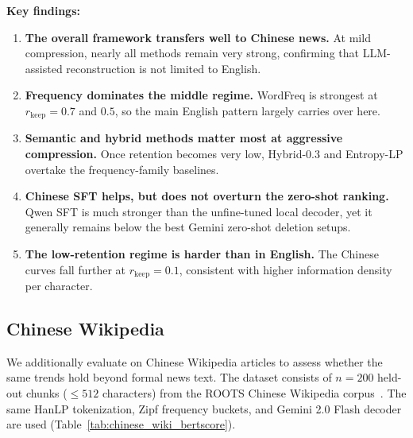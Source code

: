\documentclass[11pt]{article}
\newcommand{\rkeep}{r_{\mathrm{keep}}}
\begin{document}
\textbf{Key findings:}
\begin{enumerate}
    \item \textbf{The overall framework transfers well to Chinese news.} At mild compression, nearly all methods remain very strong, confirming that LLM-assisted reconstruction is not limited to English.
    \item \textbf{Frequency dominates the middle regime.} WordFreq is strongest at $\rkeep=0.7$ and $0.5$, so the main English pattern largely carries over here.
    \item \textbf{Semantic and hybrid methods matter most at aggressive compression.} Once retention becomes very low, Hybrid-$0.3$ and Entropy-LP overtake the frequency-family baselines.
    \item \textbf{Chinese SFT helps, but does not overturn the zero-shot ranking.} Qwen SFT is much stronger than the unfine-tuned local decoder, yet it generally remains below the best Gemini zero-shot deletion setups.
    \item \textbf{The low-retention regime is harder than in English.} The Chinese curves fall further at $\rkeep=0.1$, consistent with higher information density per character.
\end{enumerate}

\subsection*{Chinese Wikipedia}
\label{app:chinese_wiki_eval}

We additionally evaluate on Chinese Wikipedia articles to assess whether the same trends
hold beyond formal news text. The dataset consists of $n{=}200$ held-out chunks
($\le 512$ characters) from the ROOTS Chinese Wikipedia corpus~\citep{roots_zh_wiki}.
The same HanLP tokenization, Zipf frequency buckets, and Gemini 2.0 Flash decoder are used
(Table~\ref{tab:chinese_wiki_bertscore}).
\end{document}
